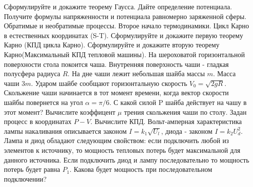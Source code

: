 \documentclass[a5paper, landscape]{exam}
\begin{document}
			\firstpageheadrule

\vspace*{0.15cm}
\begin{questions}
\question	Сформулируйте и докажите теорему Гаусса. Дайте определение потенциала. Получите формулы напряженности и потенциала равномерно заряженной сферы.
\question Обратимые и необратимые процессы. Второе начало термодинамики. Цикл Карно в естественных координатах (S-T). Сформулируйте и докажите первую теорему Карно (КПД цикла Карно). Сформулируйте и докажите вторую теорему Карно(Максимальный КПД тепловой машины).
\question На шероховатой горизонтальной поверхности стола покоится чаша. Внутренняя поверхность чаши - гладкая полусфера радиуса $R$. На дне чаши лежит небольшая шайба массы $m$. Масса чаши $3m$. Ударом шайбе сообщают горизонтальную скорость $V_0 = \sqrt{2gR}$. Скольжение чаши начинается в тот момент времени, когда вектор скорости шайбы повернется на угол $\alpha = \pi/6$. С какой силой P шайба действует на чашу в этот момент? Вычислите коэффицент $\mu$ трения скольжения чаши по столу.
\question Задан процесс в координатах $P-V$. Вычислите КПД.
\question Вольт-амперная характеристика лампы накаливания описывается законом $I=k_1 \sqrt{U_l}$, диода - законом $I = k_2 U^2_d$. Лампа и диод обладают следующим свойством: если подключить любой из элементов к источнику, то мощность тепловых потерь будет максимальной для данного источника. Если подключить диод и лампу последовательно то мощность потерь будет равна $P_1$. Какова будет мощность при последовательном подключении?
\end{questions}
\end{document}
